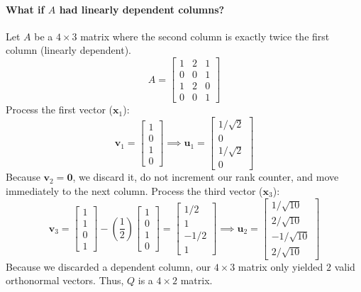 \documentclass[../linear-algebra.tex]{subfiles}
\begin{document}
\paragraph{What if $A$ had linearly dependent columns?} Let $A$ be a $4 \times 3$ matrix where the second column is exactly twice the first column (linearly dependent).
$$A = \begin{bmatrix} 1 & 2 & 1 \\ 0 & 0 & 1 \\ 1 & 2 & 0 \\ 0 & 0 & 1 \end{bmatrix}$$
Process the first vector ($\mathbf{x}_1$):
$$\mathbf{v}_1 = \begin{bmatrix} 1 \\ 0 \\ 1 \\ 0 \end{bmatrix} \implies \mathbf{u}_1 = \begin{bmatrix} 1/\sqrt{2} \\ 0 \\ 1/\sqrt{2} \\ 0 \end{bmatrix}$$
Because $\mathbf{v}_2 = \mathbf{0}$, we discard it, do not increment our rank counter, and move immediately to the next column.\newline
Process the third vector ($\mathbf{x}_3$):
$$\mathbf{v}_3 = \begin{bmatrix} 1 \\ 1 \\ 0 \\ 1 \end{bmatrix} - \left( \frac{1}{2} \right) \begin{bmatrix} 1 \\ 0 \\ 1 \\ 0 \end{bmatrix} = \begin{bmatrix} 1/2 \\ 1 \\ -1/2 \\ 1 \end{bmatrix} \implies \mathbf{u}_2 = \begin{bmatrix} 1/\sqrt{10} \\ 2/\sqrt{10} \\ -1/\sqrt{10} \\ 2/\sqrt{10} \end{bmatrix}$$
Because we discarded a dependent column, our $4 \times 3$ matrix only yielded $2$ valid orthonormal vectors. Thus, $Q$ is a $4 \times 2$ matrix.
\end{document}

